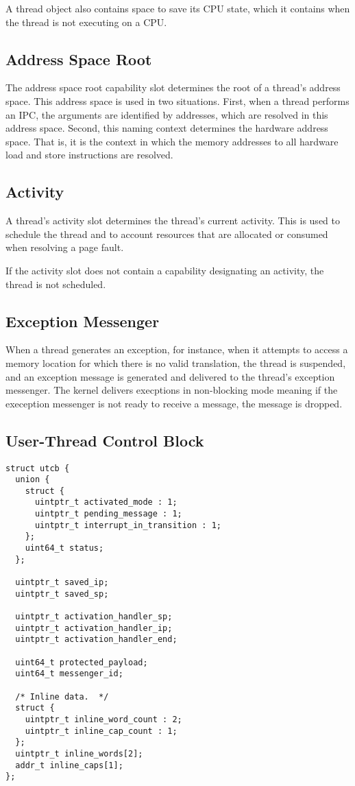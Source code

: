 A thread object also contains space to save its CPU state, which it
contains when the thread is not executing on a CPU.

\subsection{Address Space Root}

The address space root capability slot determines the root of a
thread's address space.  This address space is used in two situations.
First, when a thread performs an IPC, the arguments are identified by
addresses, which are resolved in this address space.  Second, this
naming context determines the hardware address space.  That is, it is
the context in which the memory addresses to all hardware load and
store instructions are resolved.

\subsection{Activity}

A thread's activity slot determines the thread's current activity.
This is used to schedule the thread and to account resources that are
allocated or consumed when resolving a page fault.

If the activity slot does not contain a capability designating an
activity, the thread is not scheduled.

\subsection{Exception Messenger}

When a thread generates an exception, for instance, when it attempts
to access a memory location for which there is no valid translation,
the thread is suspended, and an exception message is generated and
delivered to the thread's exception messenger.  The kernel delivers
execptions in non-blocking mode meaning if the exeception messenger is
not ready to receive a message, the message is dropped.

\subsection{User-Thread Control Block}

\begin{lstlisting}[float,caption=The user-thread control block structure.,frame=single,captionpos=b]
struct utcb {
  union {
    struct {
      uintptr_t activated_mode : 1;
      uintptr_t pending_message : 1;
      uintptr_t interrupt_in_transition : 1;
    };
    uint64_t status;
  };

  uintptr_t saved_ip;
  uintptr_t saved_sp;

  uintptr_t activation_handler_sp;
  uintptr_t activation_handler_ip;
  uintptr_t activation_handler_end;

  uint64_t protected_payload;
  uint64_t messenger_id;

  /* Inline data.  */
  struct {
    uintptr_t inline_word_count : 2;
    uintptr_t inline_cap_count : 1;
  };
  uintptr_t inline_words[2];
  addr_t inline_caps[1];
};
\end{lstlisting}

